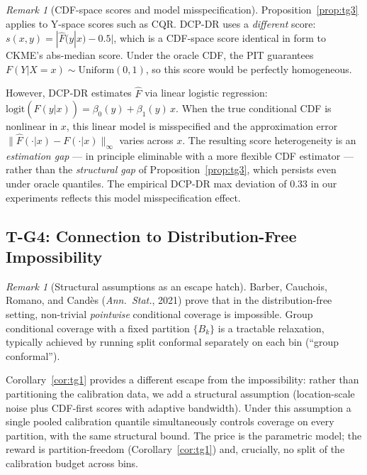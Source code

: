 \documentclass[11pt]{article}
\theoremstyle{remark}
\newtheorem{remark}[theorem]{Remark}
\begin{document}
\begin{remark}[CDF-space scores and model misspecification]
\label{rem:tg3-dcpdr}
Proposition~\ref{prop:tg3} applies to Y-space scores such as CQR.
DCP-DR uses a \emph{different} score: $s(x,y) = |\hat F(y|x) - 0.5|$,
which is a CDF-space score identical in form to CKME's abs-median
score. Under the oracle CDF, the PIT guarantees
$F(Y|X=x) \sim \mathrm{Uniform}(0,1)$, so this score would be
perfectly homogeneous.

However, DCP-DR estimates $\hat F$ via linear logistic regression:
$\mathrm{logit}(\hat F(y|x)) = \beta_0(y) + \beta_1(y)\,x$.
When the true conditional CDF is nonlinear in $x$, this linear model
is misspecified and the approximation error
$\|\hat F(\cdot|x) - F(\cdot|x)\|_\infty$ varies across $x$. The
resulting score heterogeneity is an \emph{estimation gap} --- in
principle eliminable with a more flexible CDF estimator --- rather
than the \emph{structural gap} of Proposition~\ref{prop:tg3}, which
persists even under oracle quantiles. The empirical DCP-DR max
deviation of $0.33$ in our experiments reflects this model
misspecification effect.
\end{remark}

\subsection{T-G4: Connection to Distribution-Free Impossibility}
\label{sec:tg4}

\begin{remark}[Structural assumptions as an escape hatch]
\label{rem:tg4}
Barber, Cauchois, Romano, and Cand\`es (\emph{Ann.\ Stat.}, 2021) prove that in
the distribution-free setting, non-trivial \emph{pointwise}
conditional coverage is impossible. Group conditional coverage with a
fixed partition $\{B_k\}$ is a tractable relaxation, typically
achieved by running split conformal separately on each bin (``group
conformal'').

Corollary~\ref{cor:tg1} provides a different escape from the
impossibility: rather than partitioning the calibration data, we add
a structural assumption (location-scale noise plus CDF-first scores
with adaptive bandwidth). Under this assumption a single pooled
calibration quantile simultaneously controls coverage on every
partition, with the same structural bound. The price is the
parametric model; the reward is partition-freedom
(Corollary~\ref{cor:tg1}) and, crucially, no split of the
calibration budget across bins.
\end{remark}
\end{document}
